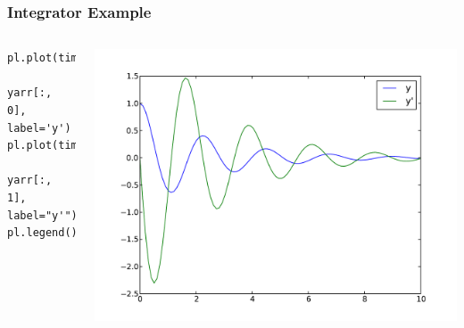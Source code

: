 \documentclass[10pt,colorlinks]{beamer}
\begin{document}
\begin{frame}[fragile]\frametitle{Integrator Example}
\begin{columns}[c]
\begin{verbatim}
pl.plot(time_vec, 
    yarr[:, 0], label='y')
pl.plot(time_vec, 
    yarr[:, 1], label="y'")
pl.legend()
\end{verbatim}

\includegraphics[width=\textwidth]{plwfigis/CursP_3_figure58}

\end{columns}
\end{frame}
\end{document}
